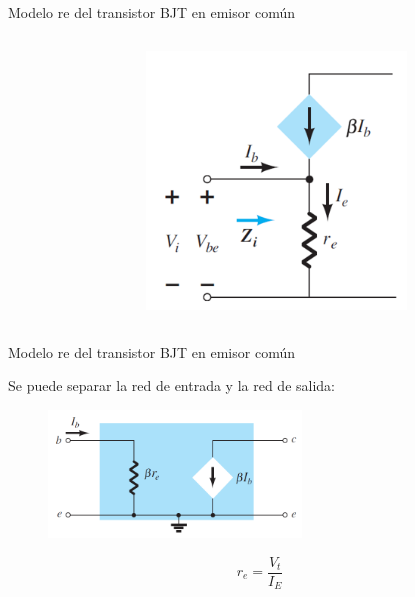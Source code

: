 \documentclass[t,aspectratio=169]{beamer}
\begin{document}
\begin{frame}{Modelo re del transistor BJT en emisor común}
\begin{columns}
\begin{column}{0.33\textwidth}
\begin{figure}[H]
\end{figure}
\end{column}
\begin{column}{0.33\textwidth}
\begin{figure}[H]
    \centering
    \includegraphics[width=0.8\textwidth]{figuras/modelo_re_ec_3.png}
\end{figure}
\end{column}
\end{columns}

\end{frame}


\begin{frame}{Modelo re del transistor BJT en emisor común}

Se puede separar la red de entrada y la red de salida:

\begin{figure}[H]
    \centering
    \includegraphics[width=0.6\textwidth]{figuras/modelo_re_ec_4.png}
\end{figure}

\[ r_e = \dfrac{V_t}{I_E} \]

\end{frame}
\end{document}
